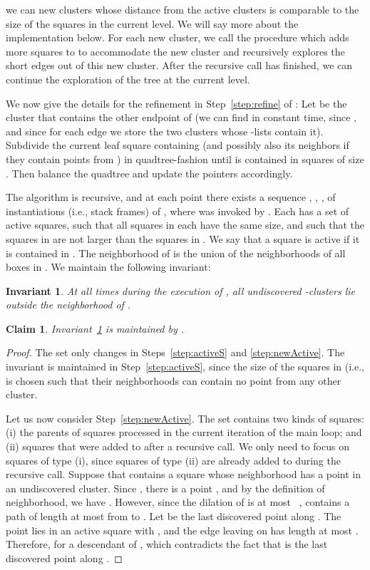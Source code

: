 \documentclass[11pt]{paper}
\newtheorem {claim}[theorem] {Claim}
\newtheorem {invariant}[theorem] {Invariant}
\begin{document}
we can  new clusters whose distance from the active clusters
is comparable to the size of the squares in the current level.
We will say more about the implementation  below.
For each new cluster, we call the procedure  
which adds more squares to  to accommodate the new cluster and 
recursively explores the short edges out of this new cluster. After
the recursive call has finished, we can continue the exploration of the
tree at the current level. 

We now give the details
for the refinement in Step~\ref{step:refine} of :
Let  be
the cluster that contains the other endpoint  of  (we can find 
in constant time, since , and
since for each edge we store the two clusters whose -lists
contain it). Subdivide the current leaf square containing  (and 
possibly also its neighbors if they contain points from ) 
in quadtree-fashion until  is contained in squares of 
size .  Then balance the quadtree and update the 
 pointers
accordingly. 

The algorithm is recursive, and at each point there exists
a sequence , , , 
of instantiations (i.e., stack frames) 
of , where 
was invoked by . Each  has a set
 of active
squares, such that all squares in each 
have the same size, and such that the squares in 
are not larger than the squares in .
We say that a square is active if it is contained in
.
The neighborhood of 
is the union of the neighborhoods of all boxes in .
We maintain the following invariant:

\begin{invariant}\label{inv:neighborhood}
At all times during the execution of \emph{},
all undiscovered -clusters lie outside the neighborhood of
\emph{}.
\end{invariant}

\begin{claim}\label{clm:invariant}
Invariant~\ref{inv:neighborhood} is maintained by \emph{}.
\end{claim}

\begin{proof}
The set  only changes in Steps~\ref{step:activeS} and
\ref{step:newActive}. The invariant is maintained in
Step~\ref{step:activeS}, since the size of the squares in  
(i.e.,  is chosen such that their neighborhoods 
can contain no point from any other cluster. 

Let us now consider Step~\ref{step:newActive}. The
set  contains two kinds of squares:
(i) the parents of squares processed in the current iteration
of the main loop; and (ii) squares that were added to
 after a recursive call. We only need
to focus on squares of type (i), since squares of type (ii)
are already added to  during the recursive
call.
Suppose that  contains a square  whose neighborhood
has a point  in an undiscovered cluster. Since ,
there is a point , and by the definition
of neighborhood, we have .
However, since the dilation of  is at most
~\cite{KeilGu92},  contains a path  of length at most
 from  to . Let
 be the last discovered point along . The point  lies
in an active square  with , and the edge  leaving
 on  has length at most . Therefore,
  for a descendant  of , which
contradicts the fact that  is the last discovered point along
.
\end{proof}
\end{document}
